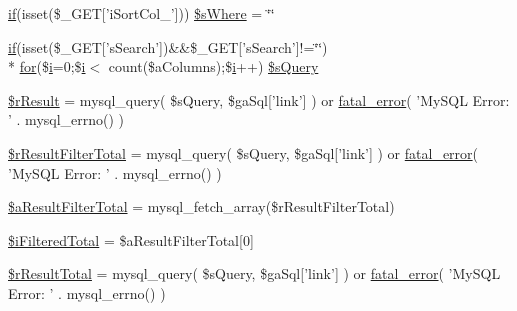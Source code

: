 \begin{DoxyCompactItemize}
\item 
\hyperlink{fullpage_2plugin_8js_a8b98017e64ef036adb9ae327ff94abe1}{if}(isset(\$\+\_\+\+G\+E\+T\mbox{[}'i\+Sort\+Col\+\_'\mbox{]})) \hyperlink{examples_2server__side_2scripts_2server__processing_8php_a377c76acb9c99eb7153f952d3e677c2b}{\$s\+Where} = \char`\"{}\char`\"{}
\item 
\hyperlink{fullpage_2plugin_8js_a8b98017e64ef036adb9ae327ff94abe1}{if}(isset(\$\+\_\+\+G\+E\+T\mbox{[}'s\+Search'\mbox{]})\&\&\$\+\_\+\+G\+E\+T\mbox{[}'s\+Search'\mbox{]}!=\char`\"{}\char`\"{}) \\*
\hyperlink{tinymce_8jquery_8dev_8js_a4675a875b20881bc5f7011f49fbd4da7}{for}(\$\hyperlink{validate_8js_a5e25b1d1bed9ab5f3174b76d6a722180}{i}=0;\$\hyperlink{validate_8js_a5e25b1d1bed9ab5f3174b76d6a722180}{i}$<$ count(\$a\+Columns);\$\hyperlink{validate_8js_a5e25b1d1bed9ab5f3174b76d6a722180}{i}++) \hyperlink{examples_2server__side_2scripts_2server__processing_8php_a5175d5486118502db3f7aa1ccf7029cc}{\$s\+Query}
\item 
\hyperlink{examples_2server__side_2scripts_2server__processing_8php_a8f423fcb1764890d70da997a4140f703}{\$r\+Result} = mysql\+\_\+query( \$s\+Query, \$ga\+Sql\mbox{[}'link'\mbox{]} ) or \hyperlink{examples_2server__side_2scripts_2server__processing_8php_a1bb235f2e57f0389e14b11592d32119a}{fatal\+\_\+error}( 'My\+S\+Q\+L Error\+: ' . mysql\+\_\+errno() )
\item 
\hyperlink{examples_2server__side_2scripts_2server__processing_8php_a29b3b8a9782e4c5b8157be2ba70a33e1}{\$r\+Result\+Filter\+Total} = mysql\+\_\+query( \$s\+Query, \$ga\+Sql\mbox{[}'link'\mbox{]} ) or \hyperlink{examples_2server__side_2scripts_2server__processing_8php_a1bb235f2e57f0389e14b11592d32119a}{fatal\+\_\+error}( 'My\+S\+Q\+L Error\+: ' . mysql\+\_\+errno() )
\item 
\hyperlink{examples_2server__side_2scripts_2server__processing_8php_a56c6da767ba5c9ca3c5f0c103dfaa77d}{\$a\+Result\+Filter\+Total} = mysql\+\_\+fetch\+\_\+array(\$r\+Result\+Filter\+Total)
\item 
\hyperlink{examples_2server__side_2scripts_2server__processing_8php_a48dbbdca4a5a8b8d03ef6c76dd65a5c1}{\$i\+Filtered\+Total} = \$a\+Result\+Filter\+Total\mbox{[}0\mbox{]}
\item 
\hyperlink{examples_2server__side_2scripts_2server__processing_8php_a48722b6bbefe9d4cb748bf0c3f936272}{\$r\+Result\+Total} = mysql\+\_\+query( \$s\+Query, \$ga\+Sql\mbox{[}'link'\mbox{]} ) or \hyperlink{examples_2server__side_2scripts_2server__processing_8php_a1bb235f2e57f0389e14b11592d32119a}{fatal\+\_\+error}( 'My\+S\+Q\+L Error\+: ' . mysql\+\_\+errno() )

\end{DoxyCompactItemize}
